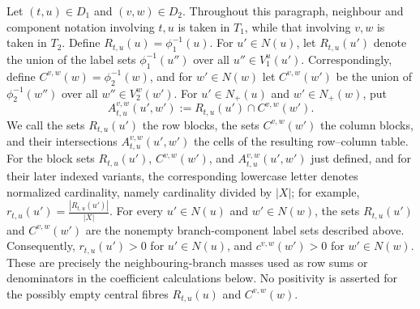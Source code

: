 \documentclass[pdflatex,sn-mathphys-num]{sn-jnl}
\theoremstyle{thmstyleone}
\begin{document}
Let $(t,u)\in D_1$ and $(v,w)\in D_2$.  Throughout this paragraph,
neighbour and component notation involving $t,u$ is taken in $T_1$, while
that involving $v,w$ is taken in $T_2$.  Define
$R_{t,u}(u)=\phi_1^{-1}(u)$.  For $u'\in N(u)$, let $R_{t,u}(u')$
denote the union of the label sets $\phi_1^{-1}(u'')$ over all
$u''\in V_1^u(u')$.  Correspondingly, define
$C^{v,w}(w)=\phi_2^{-1}(w)$, and for $w'\in N(w)$ let
$C^{v,w}(w')$ be the union of $\phi_2^{-1}(w'')$ over all
$w''\in V_2^w(w')$.  For $u'\in N_+(u)$ and $w'\in N_+(w)$, put
\[
 A_{t,u}^{v,w}(u',w'):=R_{t,u}(u')\cap C^{v,w}(w').
\]
We call the sets $R_{t,u}(u')$ the row blocks, the sets $C^{v,w}(w')$
the column blocks, and their intersections $A_{t,u}^{v,w}(u',w')$ the
cells of the resulting row--column table.
For the block sets $R_{t,u}(u')$, $C^{v,w}(w')$, and
$A_{t,u}^{v,w}(u',w')$ just defined, and for their later indexed variants,
the corresponding lowercase letter denotes normalized cardinality, namely
cardinality divided by $|X|$; for example,
$r_{t,u}(u')=\frac{|R_{t,u}(u')|}{|X|}$.
For every $u'\in N(u)$ and $w'\in N(w)$, the sets $R_{t,u}(u')$ and
$C^{v,w}(w')$ are the nonempty branch-component label sets described above.
Consequently, $r_{t,u}(u')>0$ for $u'\in N(u)$, and
$c^{v,w}(w')>0$ for $w'\in N(w)$.
These are precisely the neighbouring-branch masses used as row sums or
denominators in the coefficient calculations below.  No positivity is
asserted for the possibly empty central fibres $R_{t,u}(u)$ and
$C^{v,w}(w)$.
\end{document}
